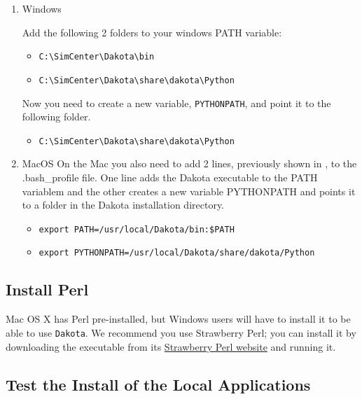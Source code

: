 \begin{enumerate}
\item{Windows}

Add the following 2 folders to your windows PATH variable:
\begin{itemize}
    \item \texttt{C:\textbackslash SimCenter\textbackslash Dakota\textbackslash bin}
    \item \texttt{C:\textbackslash SimCenter\textbackslash Dakota\textbackslash share\textbackslash dakota\textbackslash Python}
\end{itemize}

Now you need to create a new variable, \texttt{PYTHONPATH}, and point it to the following folder.


\begin{itemize}
    \item \texttt{C:\textbackslash SimCenter\textbackslash Dakota\textbackslash share\textbackslash dakota\textbackslash Python}
\end{itemize}

\item{MacOS}
On the Mac you also need to add 2 lines, previously shown in ,
 to the .bash\_profile file. One line adds the Dakota executable to the PATH variablem and 
the other creates a new variable PYTHONPATH and points it to a folder in the  Dakota 
installation directory. 

\begin{itemize}
    \item \texttt{export PATH=/usr/local/Dakota/bin:\${PATH}}
    \item \texttt{export PYTHONPATH=/usr/local/Dakota/share/dakota/Python}
\end{itemize}
\end{enumerate}

\subsection{Install  Perl}

Mac OS X has Perl pre-installed, but Windows users will have to
install it to be able to use \texttt{Dakota}. We recommend you use Strawberry
Perl; you can install it by downloading the executable from
its \href{http://strawberryperl.com}{Strawberry Perl website} and
running it.

\subsection{Test the Install of the Local Applications}

